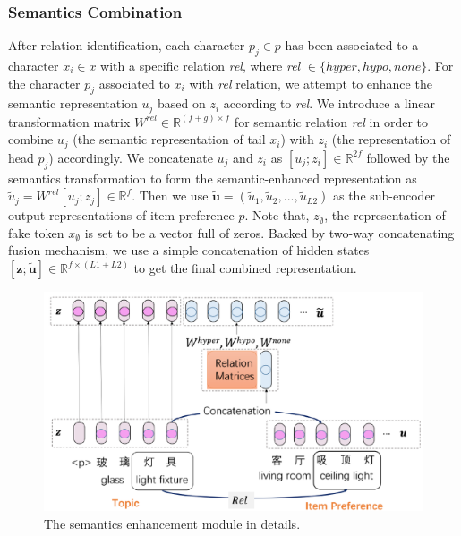 \subsubsection{Semantics Combination}
\label{sec:combination}
After relation identification, 
each character $p_j \in p$ has been associated to 
a character $x_i \in x$ with a specific relation \emph{rel},
where \emph{rel} $\in \{ hyper, hypo, none\}$.
For the character $p_j$ associated to $x_i$ with \emph{rel} relation,
we attempt to enhance the semantic representation $u_j$ 
based on $z_i$ according to \emph{rel}.
We introduce a linear transformation matrix $W^{rel} \in \mathbb{ R }^{(f+g) \times f}$ for semantic relation \emph{rel}
in order to combine  $u_j$ (the semantic representation of tail $x_i$) with 
$z_i$ (the representation of head $p_j$) accordingly.
We concatenate $u_j$ and $z_i$ as $[u_j; z_i] \in \mathbb{ R }^{2f}$ followed by 
the semantics transformation 
to form the semantic-enhanced representation
as $\tilde{u}_j = W^{rel}[u_j ; z_j] \in \mathbb{ R }^{f}$.
Then we use $\tilde{\textbf{u}} = (\tilde{u}_1, \tilde{u}_2, ..., \tilde{u}_{L2})$
as the sub-encoder output representations of item preference $p$.
Note that, $z_{\emptyset}$, the representation of fake token $x_{\emptyset}$ is set to be a vector full of zeros.
Backed by two-way concatenating fusion mechanism, 
we use a simple concatenation of hidden states $[\textbf{z}; \tilde{\textbf{u}}] \in \mathbb{ R }^{f\times (L1+L2)}$ to get the final combined representation.





\begin{figure}[th!]
	\centering
	\includegraphics[width=0.9\columnwidth]{figures/enhancement}
	\caption{The semantics enhancement module in details.}
	\label{fig:enhancement}
\end{figure}


